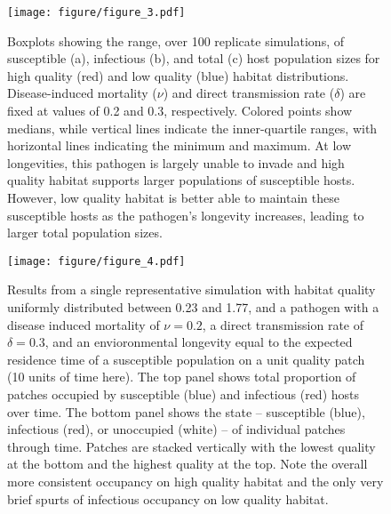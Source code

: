 \documentclass{article}
\begin{document}
\begin{figure}
\texttt{[image: figure/figure\_3.pdf]}
\centering
\caption{Boxplots showing the range, over 100 replicate simulations, of susceptible (a), infectious (b), and total (c) host population sizes for high quality (red) and low quality (blue) habitat distributions.  Disease-induced mortality ($\nu$) and direct transmission rate ($\delta$) are fixed at values of 0.2 and 0.3, respectively.  Colored points show medians, while vertical lines indicate the inner-quartile ranges, with horizontal lines indicating the minimum and maximum.  At low longevities, this pathogen is largely unable to invade and high quality habitat supports larger populations of susceptible hosts.  However, low quality habitat is better able to maintain these susceptible hosts as the pathogen's longevity increases, leading to larger total population sizes.}
\label{popsizes}
\end{figure}

\begin{figure}
\texttt{[image: figure/figure\_4.pdf]}
\centering
\caption{Results from a single representative simulation with habitat quality uniformly distributed between 0.23 and 1.77, and a pathogen with a disease induced mortality of $\nu = 0.2$, a direct transmission rate of $\delta = 0.3$, and an envioronmental longevity equal to the expected residence time of a susceptible population on a unit quality patch (10 units of time here).  The top panel shows total proportion of patches occupied by susceptible (blue) and infectious (red) hosts over time.  The bottom panel shows the state -- susceptible (blue), infectious (red), or unoccupied (white) -- of individual patches through time.  Patches are stacked vertically with the lowest quality at the bottom and the highest quality at the top.  Note the overall more consistent occupancy on high quality habitat and the only very brief spurts of infectious occupancy on low quality habitat.}
\label{simvis}
\end{figure}

\clearpage
\end{document}
